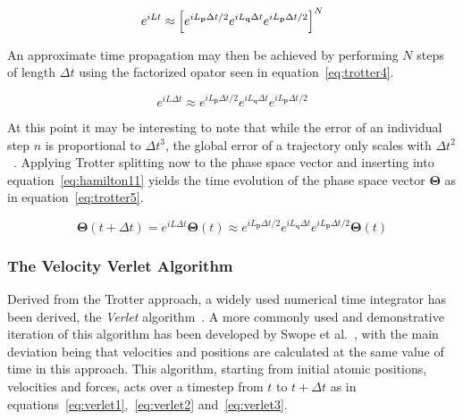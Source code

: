 \documentclass[11pt]{article}
\begin{document}
\begin{equation}
  e^{iLt} \approx \Bigl[e^{iL_{\textbf{p}}\Delta t/2}e^{iL_{\textbf{q}}\Delta t}e^{iL_{\textbf{p}}\Delta t/2}\Bigl]^N
  \label{eq:trotter3}
\end{equation}

\bigskip

\noindent An approximate time propagation may then be achieved by performing $N$ steps of length $\Delta t$ using the factorized opator seen in equation~\ref{eq:trotter4}.

\begin{equation}
  e^{iL\Delta t} \approx e^{iL_{\textbf{p}}\Delta t/2}e^{iL_{\textbf{q}}\Delta t}e^{iL_{\textbf{p}}\Delta t/2}
  \label{eq:trotter4}
\end{equation}

\bigskip

\noindent At this point it may be interesting to note that while the error of an individual step $n$ is proportional to $\Delta t^3$, the global error of a trajectory only scales with $\Delta t^2$~\cite{Allen2017}. Applying Trotter splitting now to the phase space vector and inserting into equation~\ref{eq:hamilton11} yields the time evolution of the phase space vector $\mathbf{\Theta}$ as in equation~\ref{eq:trotter5}.

\begin{equation}
  \mathbf{\Theta}(t+\Delta t) = e^{iL\Delta t}\mathbf{\Theta}(t) \approx e^{iL_{\textbf{p}}\Delta t/2}e^{iL_{\textbf{q}}\Delta t}e^{iL_{\textbf{p}}\Delta t/2}\mathbf{\Theta}(t)
  \label{eq:trotter5}
\end{equation}

\bigskip

\subsubsection{The Velocity Verlet Algorithm}
Derived from the Trotter approach, a widely used numerical time integrator has been derived, the \textit{Verlet} algorithm~\cite{Verlet1967}. A more commonly used and demonstrative iteration of this algorithm has been developed by Swope et al.~\cite{Swope1982}, with the main deviation being that velocities and positions are calculated at the same value of time in this approach. This algorithm, starting from initial atomic positions, velocities and forces, acts over a timestep from $t$ to $t + \Delta t$ as in equations~\ref{eq:verlet1},~\ref{eq:verlet2} and~\ref{eq:verlet3}.
\end{document}
